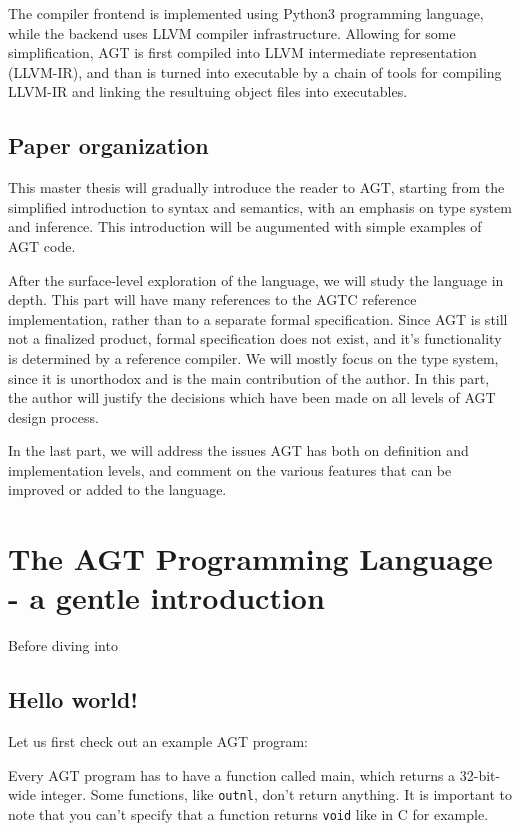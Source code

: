 \documentclass[times, utf8, diplomski]{fer}
\begin{document}
The compiler frontend is implemented using Python3 programming language,
while the backend uses LLVM \citep{c_llvm_lattner} compiler infrastructure.
Allowing for some simplification, AGT is first compiled into LLVM intermediate representation (LLVM-IR),
and than is turned into executable by a chain of tools for compiling LLVM-IR and 
linking the resultuing object files into executables.

\section{Paper organization}

This master thesis will gradually introduce the reader to AGT, starting from the simplified introduction
to syntax and semantics, with an emphasis on type system and inference. This introduction will be
augumented with simple examples of AGT code. 

After the surface-level exploration of the language, we will study the language in depth. 
This part will have many references to the AGTC reference implementation, 
rather than to a separate formal specification. Since AGT is still not a finalized product,
formal specification does not exist, and it's functionality is determined by a reference compiler.
We will mostly focus on the type system, since it is unorthodox and is the main contribution of the author.
In this part, the author will justify the decisions which have been made on all levels of AGT design process.

In the last part, we will address the issues AGT has both on definition and implementation levels,
and comment on the various features that can be improved or added to the language.

\chapter{The AGT Programming Language - a gentle introduction}

Before diving into

\section{Hello world!}

Let us first check out an example AGT program:



Every AGT program has to have a function called main, which returns a 32-bit-wide integer.
Some functions, like \texttt{outnl}, don't return anything. It is important to note that you can't
specify that a function returns \texttt{void} like in C for example.
\end{document}
